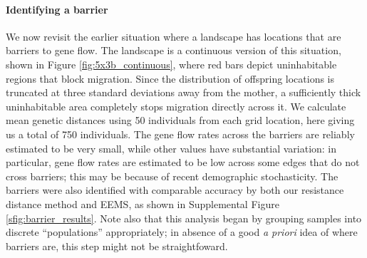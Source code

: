 \documentclass{article}
\begin{document}
\paragraph{Identifying a barrier}
We now revisit the earlier situation where a landscape has locations that are barriers to gene flow.
The landscape is a continuous version of this situation,
shown in Figure \ref{fig:5x3b_continuous},
where red bars depict uninhabitable regions that block migration.
Since the distribution of offspring locations is truncated at three standard deviations
away from the mother, a sufficiently thick uninhabitable area completely stops migration
directly across it.
We calculate mean genetic distances using 50 individuals 
from each grid location,
here giving us a total of 750 individuals.
The gene flow rates across the barriers are reliably estimated to be very small,
while other values have substantial variation:
in particular, gene flow rates are estimated to be low
across some edges that do not cross barriers;
this may be because of recent demographic stochasticity.
The barriers were also identified with comparable accuracy by both our resistance distance method
and EEMS, as shown in Supplemental Figure \ref{sfig:barrier_results}.
Note also that this analysis began by grouping samples into discrete ``populations'' appropriately;
in absence of a good \textit{a priori} idea of where barriers are,
this step might not be straightfoward.
\end{document}
